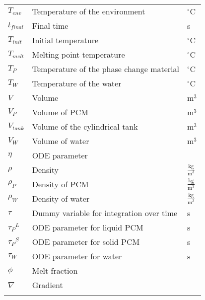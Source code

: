 \documentclass[12pt]{article}
\begin{document}
\begin{longtabu}{l X[l] l}
\\
${T_{env}}$ & Temperature of the environment & ${}^{\circ}$C
\\
${t_{final}}$ & Final time & s
\\
${T_{init}}$ & Initial temperature & ${}^{\circ}$C
\\
${T_{melt}}$ & Melting point temperature & ${}^{\circ}$C
\\
${T_{P}}$ & Temperature of the phase change material & ${}^{\circ}$C
\\
${T_{W}}$ & Temperature of the water & ${}^{\circ}$C
\\
$V$ & Volume & $\text{m}^{3}$
\\
${V_{P}}$ & Volume of PCM & $\text{m}^{3}$
\\
${V_{tank}}$ & Volume of the cylindrical tank & $\text{m}^{3}$
\\
${V_{W}}$ & Volume of water & $\text{m}^{3}$
\\
$η$ & ODE parameter & 
\\
$ρ$ & Density & $\frac{\text{kg}}{\text{m}^{3}}$
\\
${ρ_{P}}$ & Density of PCM & $\frac{\text{kg}}{\text{m}^{3}}$
\\
${ρ_{W}}$ & Density of water & $\frac{\text{kg}}{\text{m}^{3}}$
\\
$τ$ & Dummy variable for integration over time & s
\\
${{τ_{P}}^{L}}$ & ODE parameter for liquid PCM & s
\\
${{τ_{P}}^{S}}$ & ODE parameter for solid PCM & s
\\
${τ_{W}}$ & ODE parameter for water & s
\\
$ϕ$ & Melt fraction & 
\\
$∇$ & Gradient & 
\\
\bottomrule
\label{Table:ToS}
\end{longtabu}
\end{document}
